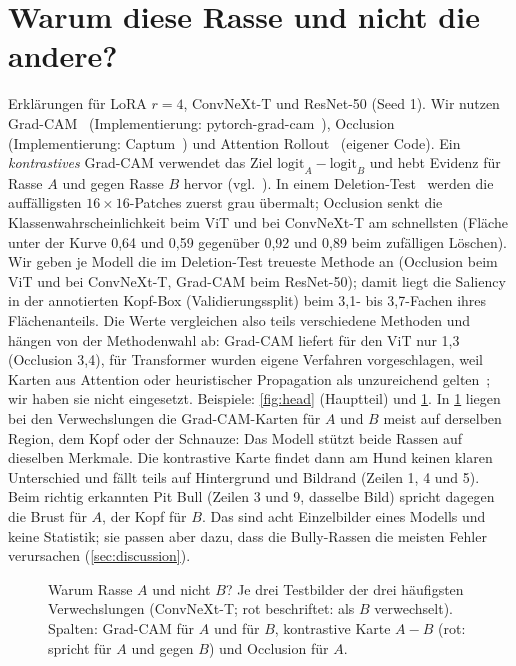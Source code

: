 \section{Warum diese Rasse und nicht die andere?}
\label{sec:explain}
Erklärungen für LoRA $r=4$, ConvNeXt-T und ResNet-50 (Seed 1). Wir nutzen Grad-CAM~\cite{selvaraju2017gradcam} (Implementierung:
pytorch-grad-cam~\cite{gildenblat2021gradcam}), Occlusion~\cite{zeiler2014visualizing} (Implementierung:
Captum~\cite{kokhlikyan2020captum}) und Attention Rollout~\cite{abnar2020rollout} (eigener Code). Ein
\emph{kontrastives} Grad-CAM verwendet das Ziel $\text{logit}_A-\text{logit}_B$ und hebt Evidenz für
Rasse $A$ und gegen Rasse $B$ hervor (vgl.~\cite{prabhushankar2020contrastive}). In einem
Deletion-Test~\cite{petsiuk2018rise} werden die auffälligsten $16\times16$-Patches zuerst grau
übermalt; Occlusion senkt die Klassenwahrscheinlichkeit beim ViT und bei ConvNeXt-T am schnellsten
(Fläche unter der Kurve 0,64 und 0,59 gegenüber 0,92 und 0,89 beim zufälligen Löschen). Wir geben je Modell die im Deletion-Test treueste Methode an (Occlusion beim ViT und bei ConvNeXt-T,
Grad-CAM beim ResNet-50); damit liegt die Saliency in der annotierten Kopf-Box (Validierungssplit) beim 3,1-
bis 3,7-Fachen ihres Flächenanteils. Die Werte vergleichen also teils verschiedene Methoden und hängen von
der Methodenwahl ab: Grad-CAM liefert für den ViT nur 1,3 (Occlusion 3,4), für Transformer wurden eigene
Verfahren vorgeschlagen, weil Karten aus Attention oder heuristischer Propagation als unzureichend
gelten~\cite{chefer2021transformer}; wir haben sie nicht eingesetzt.
Beispiele: \cref{fig:head} (Hauptteil) und \cref{fig:contrastive}.
In \cref{fig:contrastive} liegen bei den Verwechslungen die Grad-CAM-Karten für $A$ und $B$ meist auf derselben
Region, dem Kopf oder der Schnauze: Das Modell stützt beide Rassen auf dieselben Merkmale. Die kontrastive
Karte findet dann am Hund keinen klaren Unterschied und fällt teils auf Hintergrund und Bildrand (Zeilen 1, 4
und 5). Beim richtig erkannten Pit Bull (Zeilen 3 und 9, dasselbe Bild) spricht dagegen die Brust für $A$,
der Kopf für $B$. Das sind acht Einzelbilder eines Modells und keine Statistik; sie passen aber dazu, dass
die Bully-Rassen die meisten Fehler verursachen (\cref{sec:discussion}).




\begin{figure}[b]
  \centering
  \caption{Warum Rasse $A$ und nicht $B$? Je drei Testbilder der drei häufigsten Verwechslungen (ConvNeXt-T;
  rot beschriftet: als $B$ verwechselt). Spalten: Grad-CAM für $A$ und für $B$, kontrastive Karte $A-B$
  (rot: spricht für $A$ und gegen $B$) und Occlusion für $A$.}
  \label{fig:contrastive}
\end{figure}

